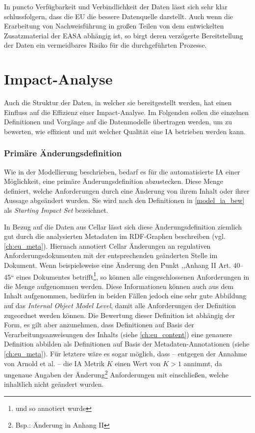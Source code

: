     \medskip
In puncto Verfügbarkeit und Verbindlichkeit der Daten lässt sich sehr klar schlussfolgern, dass die \ac{EU} die bessere Datenquelle darstellt.
Auch wenn die Erarbeitung von Nachweisführung in großen Teilen von dem entwickelten Zusatzmaterial der \ac{EASA} abhängig ist, so birgt deren verzögerte Bereitstellung der Daten ein vermeidbares Risiko für die durchgeführten Prozesse.

\pagebreak
    
    \section{Impact-Analyse}

Auch die Struktur der Daten, in welcher sie bereitgestellt werden, hat einen Einfluss auf die Effizienz einer Impact-Analyse.
Im Folgenden sollen die einzelnen Definitionen und Vorgänge auf die Datenmodelle übertragen werden, um zu bewerten, wie effizient und mit welcher Qualität eine \ac{IA} betrieben werden kann.

\subsubsection{Primäre Änderungsdefinition}

Wie in der Modellierung beschrieben, bedarf es für die automatisierte \ac{IA} einer Möglichkeit, eine primäre Änderungsdefinition abzustecken. 
Diese Menge definiert, welche Anforderungen durch eine Änderung von ihrem Inhalt oder ihrer Aussage abgeändert wurden.
Sie wird nach den Definitionen in \ref{model_ia_bew}  als \textit{Starting Impact Set}  bezeichnet.

\medskip
In Bezug auf die Daten aus Cellar lässt sich diese Änderungsdefinition ziemlich gut durch die analysierten Metadaten im \ac{RDF}-Graphen beschreiben (vgl. \ref{ch:eu_meta}).
Hiernach annotiert Cellar Änderungen an regulativen Anforderungsdokumenten mit der entsprechenden geänderten Stelle im Dokument.
Wenn beispielsweise eine Änderung den Punkt ,,Anhang II Art. 40--45`` eines Dokumentes betrifft\footnote{und so annotiert wurde}, so können alle eingeschlossenen Anforderungen in die Menge aufgenommen werden.
Diese Informationen können auch aus dem Inhalt aufgenommen, bedürfen in beiden Fällen jedoch eine sehr gute Abbildung auf das \textit{Internal Object Model Level}, damit alle Anforderungen der Definition zugeordnet werden können.
Die Bewertung dieser Definition ist abhängig der Form, es gilt aber anzunehmen, dass Definitionen auf Basis der Verarbeitungsanweisungen des Inhalts (siehe \ref{ch:eu_content}) eine genauere Definition abbilden als Definitionen auf Basis der Metadaten-Annotationen (siehe \ref{ch:eu_meta}). 
Für letztere wäre es sogar möglich, dass -- entgegen der Annahme von Arnold et al. -- die \ac{IA} Metrik $K$ einen Wert von $K > 1$ annimmt, da ungenaue Angaben der Änderung\footnote{Bsp.: Änderung in Anhang II} Anforderungen mit einschließen, welche inhaltlich nicht geändert wurden. 

